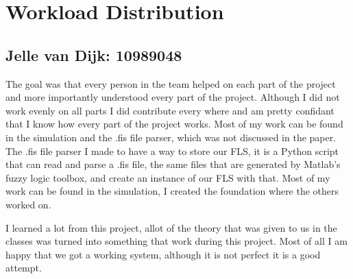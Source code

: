 \documentclass[conference]{IEEEtran}
\begin{document}
\nocite{*}




\newpage

\section{Workload Distribution}
\subsection*{Jelle van Dijk: 10989048}
The goal was that every person in the team helped on each part of the project and more importantly understood every part of the project. Although I did not work evenly on all parts I did contribute every where and am pretty confidant that I know how every part of the project works. Most of my work can be found in the simulation and the .fis file parser, which was not discussed in the paper. The .fis file parser I made to have a way to store our FLS, it is a Python script that can read and parse a .fis file, the same files that are generated by Matlab's fuzzy logic toolbox, and create an instance of our FLS with that. Most of my work can be found in the simulation, I created the foundation where the others worked on.


I learned a lot from this project, allot of the theory that was given to us in the classes was turned into something that work during this project. Most of all I am happy that we got a working system, although it is not perfect it is a good attempt.


\end{document}
